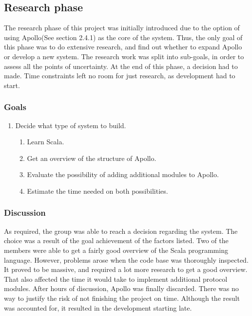 \subsection{Research phase}

The research phase of this project was initially introduced due to the option of using Apollo(See section 2.4.1) as the core of the system. Thus, the only goal of this phase was to do extensive research, and find out whether to expand Apollo or develop a new system. The research work was split into sub-goals, in order to assess all the points of uncertainty. At the end of this phase, a decision had to made. Time constraints left no room for just research, as development had to start.

\subsubsection{Goals}

\begin{enumerate}
\item Decide what type of system to build.
\begin{enumerate}
\item Learn Scala.
\item Get an overview of the structure of Apollo.
\item Evaluate the possibility of adding additional modules to Apollo.
\item Estimate the time needed on both possibilities.
\end{enumerate}
\end{enumerate}

\subsubsection{Discussion}

As required, the group was able to reach a decision regarding the system. The choice was a result of the goal achievement of the factors listed. Two of the members were able to get a fairly good overview of the Scala programming language. However, problems arose when the code base was thoroughly inspected. It proved to be massive, and required a lot more research to get a good overview. That also affected the time it would take to implement additional protocol modules. After hours of discussion, Apollo was finally discarded. There was no way to justify the risk of not finishing the project on time. Although the result was accounted for, it resulted in the development starting late.

